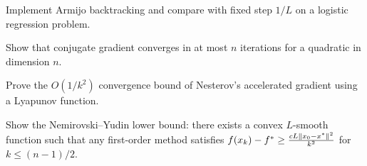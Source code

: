 \begin{exercise}[$\star\star$]
Implement Armijo backtracking and compare with fixed step $1/L$ on a logistic
regression problem.
\end{exercise}

\begin{exercise}[$\star\star$]
Show that conjugate gradient converges in at most $n$ iterations for a quadratic in
dimension $n$.
\end{exercise}

\begin{exercise}[$\star\star\star$]
Prove the $O(1/k^2)$ convergence bound of Nesterov's accelerated gradient using a
Lyapunov function.
\end{exercise}

\begin{exercise}[$\star\star\star$]
Show the Nemirovski--Yudin lower bound: there exists a convex $L$-smooth function
such that any first-order method satisfies
$f(x_k) - f^* \geq \frac{cL\left\| x_0-x^* \right\|^2}{k^2}$ for $k \leq (n-1)/2$.
\end{exercise}
